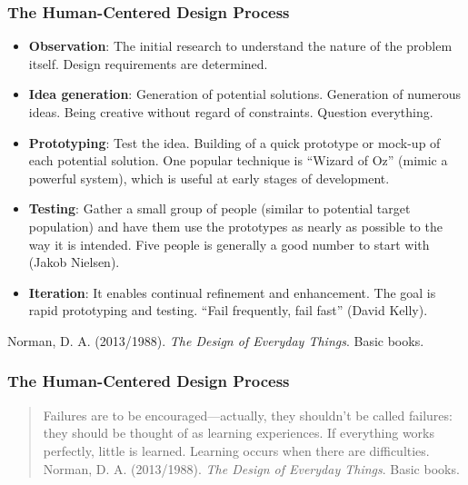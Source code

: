 \documentclass[screen, aspectratio=169]{beamer}
\begin{document}
\begin{frame}
\frametitle{The Human-Centered Design Process}
\begin{itemize}
\item \textbf{Observation}: The initial research to understand the nature of the problem itself. Design requirements are determined.
\item \textbf{Idea generation}: Generation of potential solutions. Generation of numerous ideas. Being creative without regard of constraints. Question everything.
\item \textbf{Prototyping}: Test the idea. Building of a quick prototype or mock-up of each potential solution. One popular technique is ``Wizard of Oz'' (mimic a powerful system), which is useful at early stages of development.
\item \textbf{Testing}: Gather a small group of people (similar to potential target population) and have them use the prototypes as nearly as possible to the way it is intended. Five people is generally a good number to start with (Jakob Nielsen).
\item \textbf{Iteration}: It enables continual refinement and enhancement. The goal is rapid prototyping and testing. ``Fail frequently, fail fast'' (David Kelly). 
\end{itemize}
{\scriptsize Norman, D. A. (2013/1988). \emph{The Design of Everyday Things}. Basic books. \cite{Norman.1988.psychology}}
\end{frame}
%
\begin{frame}
\frametitle{The Human-Centered Design Process}
\begin{quote}
Failures are to be encouraged---actually, they shouldn't be called failures: they should be thought of as learning experiences. If everything works perfectly, little is learned. Learning occurs when there are difficulties. \cite[p.229]{Norman.1988.psychology}\\
\vspace{5mm}
Norman, D. A. (2013/1988). \emph{The Design of Everyday Things}. Basic books.
\end{quote}
\end{frame}
%
\end{document}
